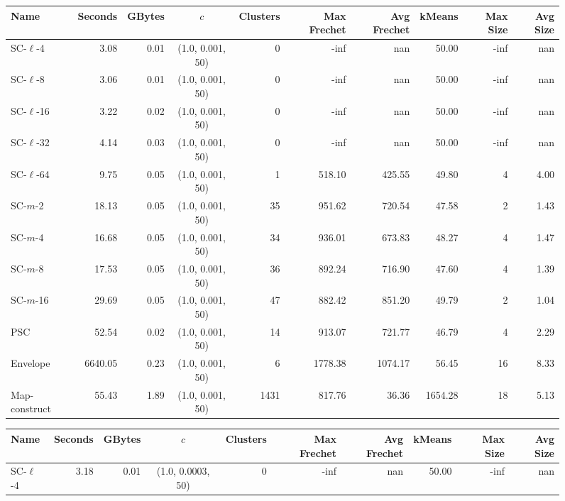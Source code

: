 \begin{figure} \begin{center}
    \begin{minipage}{\textwidth}
    {
    \begin{tabular}{@{}lrrcrrrrrr@{}}
        \toprule
        Name & Seconds & GBytes & $c$ & Clusters & Max Frechet & Avg Frechet & kMeans & Max Size & Avg Size\\
        \midrule
        SC-$\ell$-4 & 3.08 & 0.01 & (1.0, 0.001, 50) & 0 & -inf & nan & 50.00 & -inf & nan\\
        SC-$\ell$-8 & 3.06 & 0.01 & (1.0, 0.001, 50) & 0 & -inf & nan & 50.00 & -inf & nan\\
        SC-$\ell$-16 & 3.22 & 0.02 & (1.0, 0.001, 50) & 0 & -inf & nan & 50.00 & -inf & nan\\
        SC-$\ell$-32 & 4.14 & 0.03 & (1.0, 0.001, 50) & 0 & -inf & nan & 50.00 & -inf & nan\\
        SC-$\ell$-64 & 9.75 & 0.05 & (1.0, 0.001, 50) & 1 & 518.10 & 425.55 & 49.80 & 4 & 4.00\\
        SC-$m$-2 & 18.13 & 0.05 & (1.0, 0.001, 50) & 35 & 951.62 & 720.54 & 47.58 & 2 & 1.43\\
        SC-$m$-4 & 16.68 & 0.05 & (1.0, 0.001, 50) & 34 & 936.01 & 673.83 & 48.27 & 4 & 1.47\\
        SC-$m$-8 & 17.53 & 0.05 & (1.0, 0.001, 50) & 36 & 892.24 & 716.90 & 47.60 & 4 & 1.39\\
        SC-$m$-16 & 29.69 & 0.05 & (1.0, 0.001, 50) & 47 & 882.42 & 851.20 & 49.79 & 2 & 1.04\\
        PSC & 52.54 & 0.02 & (1.0, 0.001, 50) & 14 & 913.07 & 721.77 & 46.79 & 4 & 2.29\\
        Envelope & 6640.05 & 0.23 & (1.0, 0.001, 50) & 6 & 1778.38 & 1074.17 & 56.45 & 16 & 8.33\\
        Map-construct & 55.43 & 1.89 & (1.0, 0.001, 50) & 1431 & 817.76 & 36.36 & 1654.28 & 18 & 5.13\\
        \bottomrule
    \end{tabular}
    }
    {
    \begin{tabular}{@{}lrrcrrrrrr@{}}
        \toprule
        Name & Seconds & GBytes & $c$ & Clusters & Max Frechet & Avg Frechet & kMeans & Max Size & Avg Size\\
        \midrule
        SC-$\ell$-4 & 3.18 & 0.01 & (1.0, 0.0003, 50) & 0 & -inf & nan & 50.00 & -inf & nan\\

\end{tabular}}
\end{minipage}
\end{center}
\end{figure}
